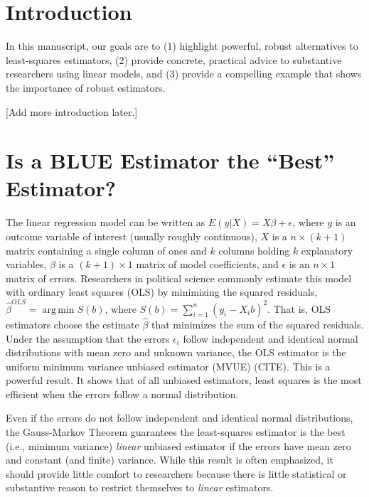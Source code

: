 \documentclass[12pt]{article}
\DeclareMathOperator*{\argmin}{arg\,min}
\begin{document}


\thispagestyle{empty}

\newpage
\doublespace

\section*{Introduction}

In this manuscript, our goals are to (1) highlight powerful, robust alternatives to least-squares estimators, (2) provide concrete, practical advice to substantive researchers using linear models, and (3) provide a compelling example that shows the importance of robust estimators.

[Add more introduction later.]



\section*{Is a BLUE Estimator the ``Best'' Estimator?}

The linear regression model can be written as $E(y | X) = X\beta + \epsilon$, where $y$ is an outcome variable of interest (usually roughly continuous), $X$ is a $n \times (k + 1)$ matrix containing a single column of ones and $k$ columns holding $k$ explanatory variables, $\beta$ is a $(k + 1) \times 1$ matrix of model coefficients, and $\epsilon$ is an $n \times 1$ matrix of errors. Researchers in political science commonly estimate this model with ordinary least squares (OLS) by minimizing the squared residuals, $\hat{\beta}^{OLS} = \argmin S(b)$, where $S(b) = \sum_{i = 1}^n(y_i - X_ib)^2$. That is, OLS estimators choose the estimate $\hat{\beta}$ that minimizes the sum of the squared residuals. Under the assumption that the errors $\epsilon_i$ follow independent and identical normal distributions with mean zero and unknown variance, the OLS estimator is the uniform minimum variance unbiased estimator (MVUE) (CITE).
This is a powerful result. It shows that of all unbiased estimators, least squares is the most efficient when the errors follow a normal distribution.

Even if the errors do not follow independent and identical normal distributions, the Gauss-Markov Theorem guarantees the least-squares estimator is the best (i.e., minimum variance) \textit{linear} unbiased estimator if the errors have mean zero and constant (and finite) variance. While this result is often emphasized, it should provide little comfort to researchers because there is little statistical or substantive reason to restrict themselves to \textit{linear} estimators.
\end{document}
